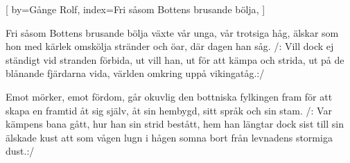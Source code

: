 

[
by={Gånge Rolf},
index={Fri såsom Bottens brusande bölja},
]

\beginverse*
Fri såsom Bottens brusande bölja
växte vår unga, vår trotsiga håg,
älskar som hon med kärlek omskölja
stränder och öar, där dagen han såg.
/: Vill dock ej ständigt vid stranden förbida,
ut vill han, ut för att kämpa och strida,
ut på de blånande fjärdarna vida,
världen omkring uppå vikingatåg.:/
\endverse

\beginverse* 
Emot mörker, emot fördom, går okuvlig den
bottniska fylkingen fram
för att skapa en framtid åt sig själv, 
åt sin hembygd, sitt språk och sin stam. 
/: Var kämpens bana gått, 
hur han sin strid bestått,
hem han längtar dock sist till sin älskade kust
att som vågen lugn i hågen somna bort från
levnadens stormiga dust.:/
\endverse
\endsong


